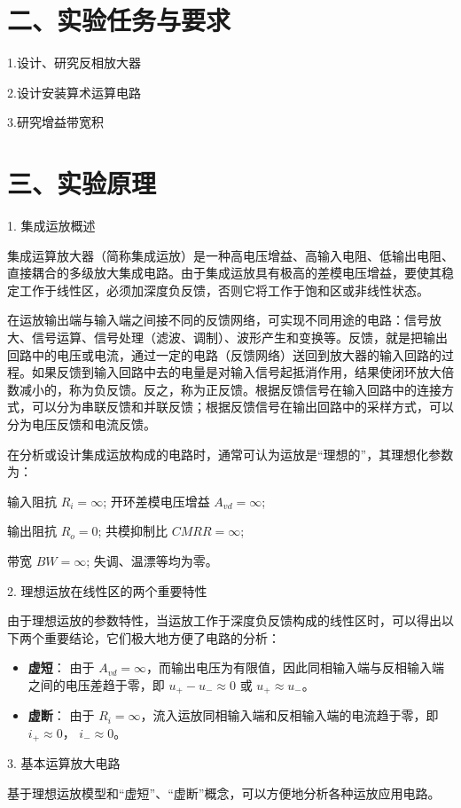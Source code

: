 \documentclass[12pt,a4paper]{article}
\begin{document}
\section*{二、实验任务与要求}
1.设计、研究反相放大器

2.设计安装算术运算电路

3.研究增益带宽积

\section*{三、实验原理}
1. 集成运放概述

集成运算放大器（简称集成运放）是一种高电压增益、高输入电阻、低输出电阻、直接耦合的多级放大集成电路。由于集成运放具有极高的差模电压增益，要使其稳定工作于线性区，必须加深度负反馈，否则它将工作于饱和区或非线性状态。

在运放输出端与输入端之间接不同的反馈网络，可实现不同用途的电路：信号放大、信号运算、信号处理（滤波、调制）、波形产生和变换等。反馈，就是把输出回路中的电压或电流，通过一定的电路（反馈网络）送回到放大器的输入回路的过程。如果反馈到输入回路中去的电量是对输入信号起抵消作用，结果使闭环放大倍数减小的，称为负反馈。反之，称为正反馈。根据反馈信号在输入回路中的连接方式，可以分为串联反馈和并联反馈；根据反馈信号在输出回路中的采样方式，可以分为电压反馈和电流反馈。

在分析或设计集成运放构成的电路时，通常可认为运放是“理想的”，其理想化参数为：

	输入阻抗 \(R_i = \infty\); 	开环差模电压增益 \(A_{vd} = \infty\);

    输出阻抗 \(R_o = 0\);		共模抑制比 \(CMRR = \infty\);

    带宽 \(BW = \infty\);		失调、温漂等均为零。

2. 理想运放在线性区的两个重要特性

由于理想运放的参数特性，当运放工作于深度负反馈构成的线性区时，可以得出以下两个重要结论，它们极大地方便了电路的分析：
\begin{itemize}
	\item \textbf{虚短}： 由于 \(A_{vd} = \infty\)，而输出电压为有限值，因此同相输入端与反相输入端之间的电压差趋于零，即 \(u_+ - u_- \approx 0\) 或 \(u_+ \approx u_-\)。
	\item \textbf{虚断}： 由于 \(R_i = \infty\)，流入运放同相输入端和反相输入端的电流趋于零，即 \(i_+ \approx 0\)， \(i_- \approx 0\)。
\end{itemize}

3. 基本运算放大电路

基于理想运放模型和“虚短”、“虚断”概念，可以方便地分析各种运放应用电路。
\end{document}
